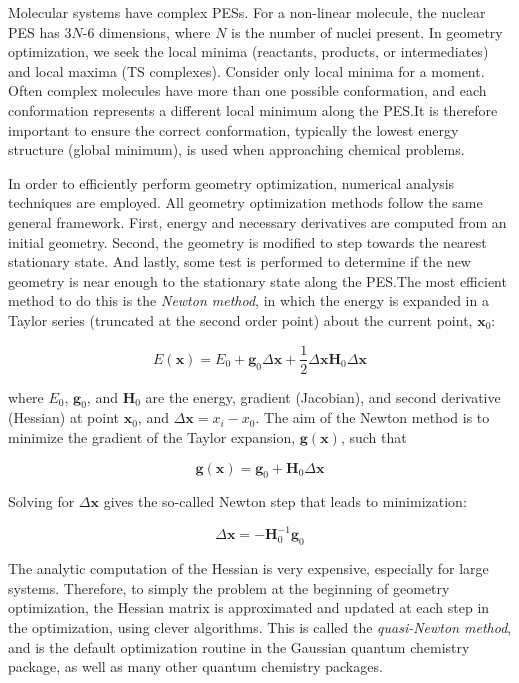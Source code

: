 \begin{doublespace}
Molecular systems have complex PESs. For a non-linear molecule, the nuclear PES
has 3$N$-6 dimensions, where $N$ is the number of nuclei
present.\cite{Heidrich1991} In geometry optimization, we seek the local minima
(reactants, products, or intermediates) and local maxima (TS complexes).
Consider only local minima for a moment. Often complex molecules have more than
one possible conformation, and each conformation represents a different local
minimum along the PES.\@ It is therefore important to ensure the correct
conformation, typically the lowest energy structure (global minimum), is used
when approaching chemical problems.

In order to efficiently perform geometry optimization, numerical analysis
techniques are employed. All geometry optimization methods follow the same
general framework.\cite{Hratchian2005} First, energy and necessary derivatives
are computed from an initial geometry. Second, the geometry is modified to step
towards the nearest stationary state. And lastly, some test is performed to
determine if the new geometry is near enough to the stationary state along the
PES.\@ The most efficient method to do this is the \emph{Newton method}, in
which the energy is expanded in a Taylor series (truncated at the second order
point) about the current point, $\mathbf{x}_0$:

\begin{equation}
  E(\mathbf{x}) = E_0 + \mathbf{g}_0\Delta\mathbf{x} + \frac{1}{2}\Delta\mathbf{x}\mathbf{H}_0\Delta \mathbf{x}
\end{equation}

\noindent where $E_0$, $\mathbf{g}_0$, and $\mathbf{H}_0$ are the energy,
gradient (Jacobian), and second derivative (Hessian) at point $\mathbf{x}_0$,
and $\Delta \mathbf{x} = x_i - x_0$. The aim of the Newton method is to
minimize the gradient of the Taylor expansion, $\mathbf{g(x)}$, such that

\begin{equation}
  \mathbf{g(x)} = \mathbf{g}_0 + \mathbf{H}_0 \Delta \mathbf{x}
\end{equation}

\noindent Solving for $\Delta \mathbf{x}$ gives the so-called Newton step that
leads to minimization:

\begin{equation}
  \Delta \mathbf{x} = -\mathbf{H}^{-1}_0\mathbf{g}_0
\end{equation}

The analytic computation of the Hessian is very expensive, especially for large
systems. Therefore, to simply the problem at the beginning of geometry
optimization, the Hessian matrix is approximated and updated at each step in
the optimization, using clever algorithms.\cite{Hratchian2005} This is called
the \emph{quasi-Newton method}, and is the default optimization routine in the
Gaussian\cite{Frisch2009} quantum chemistry package, as well as many other
quantum chemistry packages.


\end{doublespace}
